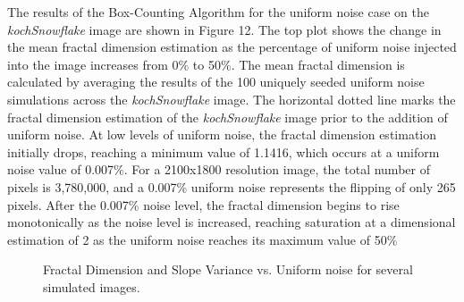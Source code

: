 \documentclass[12pt, oneside]{book}
\begin{document}
The results of the Box-Counting Algorithm for the uniform noise case on the \textit{kochSnowflake} image are shown in Figure 12.  The top plot shows the change in the mean fractal dimension estimation as the percentage of uniform noise injected into the image increases from 0\% to 50\%.  The mean fractal dimension is calculated by averaging the results of the 100 uniquely seeded uniform noise simulations across the \textit{kochSnowflake} image.  The horizontal dotted line marks the fractal dimension estimation of the \textit{kochSnowflake} image prior to the addition of uniform noise.  At low levels of uniform noise, the fractal dimension estimation initially drops, reaching a minimum value of 1.1416, which occurs at a uniform noise value of 0.007\%.   For a 2100x1800 resolution image, the total number of pixels is 3,780,000, and a 0.007\% uniform noise represents the flipping of only 265 pixels.  After  the 0.007\% noise level, the fractal dimension begins to rise monotonically as the noise level is increased, reaching saturation at a dimensional estimation of 2 as the uniform noise reaches its maximum value of 50\%

\begin{figure}[!b]
  \centering
  \caption[Fractal Dimension and Slope Variance vs. Uniform noise for several simulated images.]{Fractal Dimension and Slope Variance vs. Uniform noise for several simulated images.}
  \label{fig:simulated_multi_uniform_result}
\end{figure}
\end{document}
